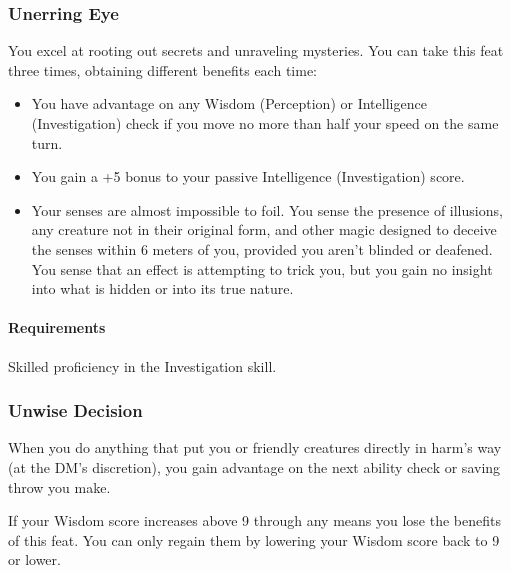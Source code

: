 \subsubsection{Unerring Eye} \label{feat::unerringeye}
    You excel at rooting out secrets and unraveling mysteries.
    You can take this feat three times, obtaining different benefits each time:
    \begin{itemize}
        \item You have advantage on any Wisdom (Perception) or Intelligence (Investigation) check if you move no more than half your speed on the same turn.
        \item You gain a +5 bonus to your passive Intelligence (Investigation) score.
        \item Your senses are almost impossible to foil.
        You sense the presence of illusions, any creature not in their original form, and other magic designed to deceive the senses within 6 meters of you, provided you aren't blinded or deafened.
        You sense that an effect is attempting to trick you, but you gain no insight into what is hidden or into its true nature.
    \end{itemize}
    \paragraph{Requirements} Skilled proficiency in the Investigation skill.
\subsubsection{Unwise Decision} \label{feat::unwisedecision}
    When you do anything that put you or friendly creatures directly in harm's way (at the DM's discretion), you gain advantage on the next ability check or saving throw you make.

    If your Wisdom score increases above 9 through any means you lose the benefits of this feat.
    You can only regain them by lowering your Wisdom score back to 9 or lower.
